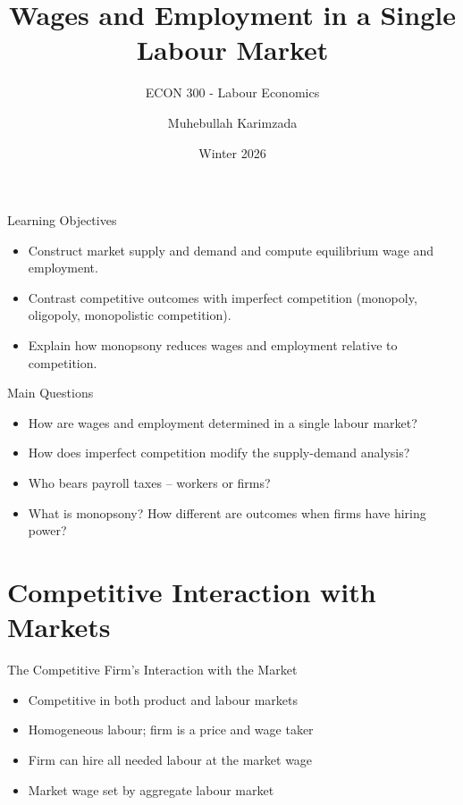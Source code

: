 \documentclass[aspectratio=169]{beamer}
\title{\textbf{Wages and Employment in a Single Labour Market\vspace{.5cm}\\  }}
\subtitle{ {\large ECON 300 - Labour Economics}}
\author{Muhebullah Karimzada}
\date{Winter 2026}
\begin{document}
\begin{frame}[plain]
  \titlepage

\end{frame}


\begin{frame}{Learning Objectives}
\transfade
\begin{itemize}[<+->]
  \item Construct market supply and demand and compute equilibrium wage and employment.
  \item Contrast competitive outcomes with imperfect competition (monopoly, oligopoly, monopolistic competition).
  \item Explain how monopsony reduces wages and employment relative to competition.

\end{itemize}
\end{frame}

\begin{frame}{Main Questions}
\transfade
\begin{itemize}[<+->]
  \item How are wages and employment determined in a single labour market?
  \item How does imperfect competition modify the supply-demand analysis?
  \item Who bears payroll taxes -- workers or firms?
  \item What is monopsony? How different are outcomes when firms have hiring power?
\end{itemize}
\end{frame}



\section{Competitive Interaction with Markets}

\begin{frame}{The Competitive Firm’s Interaction with the Market}
\transfade
\begin{itemize}[<+->]
  \item Competitive in both product and labour markets
  \item Homogeneous labour; firm is a price and wage taker
  \item Firm can hire all needed labour at the market wage
  \item Market wage set by aggregate labour market
\end{itemize}
\end{frame}
\end{document}
